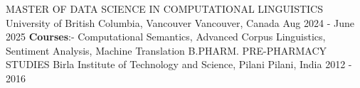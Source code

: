 

\begin{cventries}

  \cventry
  {MASTER OF DATA SCIENCE IN COMPUTATIONAL LINGUISTICS} %
  {University of British Columbia, Vancouver} %
  {Vancouver, Canada} %
  {Aug 2024 - June 2025} %
  {\textbf{Courses}:- Computational Semantics,  Advanced Corpus Linguistics, 
   Sentiment Analysis,  Machine Translation}
\vspace{1em}
\cventry
{B.PHARM. PRE-PHARMACY STUDIES} %
{Birla Institute of Technology and Science, Pilani} %
{Pilani, India} %
{2012 - 2016} %
{}
\end{cventries}
